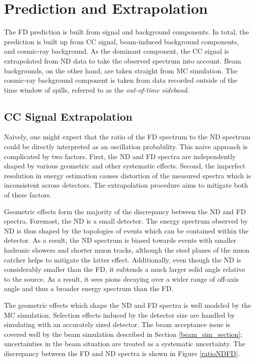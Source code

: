 \section{Prediction and Extrapolation}
\label{extrap_section}

The FD prediction is built from signal and background components.
In total, the prediction is built up from \numu CC signal, beam-induced
background components, and cosmic-ray background.
As the dominant component, the \numu CC signal is extrapolated from
ND data to take the observed spectrum into account.
Beam backgrounds, on the other hand, are taken straight from MC simulation.
The cosmic-ray background component is taken from data recorded
outside of the time window of \numi spills, referred to as the
\textit{out-of-time sideband}.

\subsection{\numu CC Signal Extrapolation}
\label{sig_extrap_section}
Naively, one might expect that the ratio of the FD spectrum to the ND spectrum
could be directly interpreted as an oscillation probability.
This naive approach is complicated by two factors.
First, the ND and FD spectra are independently shaped by various geometric
and other systematic effects.
Second, the imperfect resolution in energy estimation causes
distortion of the measured spectra which is inconsistent across detectors.
The extrapolation procedure aims to mitigate both of these factors.

Geometric effects form the majority of the discrepancy between the
ND and FD spectra.
Foremost, the ND is a small detector.
The energy spectrum observed by ND is thus shaped by the topologies
of events which can be contained within the detector.
As a result, the ND spectrum is biased towards events with
smaller hadronic showers and shorter muon tracks, although the steel planes
of the muon catcher helps to mitigate the latter effect.
Additionally, even though the ND is considerably smaller than the FD,
it subtends a much larger solid angle relative to the \numi source.
As a result, it sees pions decaying over a wider range of off-axis angle
and thus a broader energy spectrum than the FD.


The geometric effects which shape the ND and FD spectra is well modeled
by the MC simulation.
Selection effects induced by the detector size are handled by simulating
with an accurately sized detector.
The beam acceptance issue is covered well by the beam simulation described in
Section \ref{beam_sim_section}; uncertainties in the beam situation are
treated as a systematic uncertainty.
The discrepancy between the FD and ND spectra is shown in Figure
\ref{ratioNDFD}.


